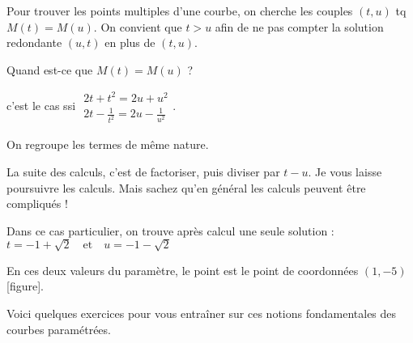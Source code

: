 \change
Pour trouver les points multiples d'une courbe,
on cherche les couples $(t,u)$ tq
$M(t)=M(u)$. On convient que $t>u$ afin de ne
pas compter la solution redondante $(u,t)$ en plus de $(t,u)$.

\change
Quand est-ce que $M(t)=M(u)$ ?

\change
c'est le cas ssi 
$\begin{array}{l}
2t+t^2=2u+u^2\\
2t-\frac{1}{t^2}=2u-\frac{1}{u^2}
\end{array}$.

\change
On regroupe les termes de même nature.

\change
La suite des calculs, c'est de factoriser, puis diviser par $t-u$.
Je vous laisse poursuivre les calculs. 
Mais sachez qu'en général les calculs peuvent être compliqués !

\change
Dans ce cas particulier, on trouve après calcul une seule solution :
$t=-1+\sqrt{2}\quad\text{et}\quad u=-1-\sqrt{2}$

\change

En ces deux valeurs du paramètre, le point est le point de coordonnées 
$(1,-5)$ [figure].



\diapo

Voici quelques exercices pour vous entraîner sur 
ces notions fondamentales des courbes paramétrées.






